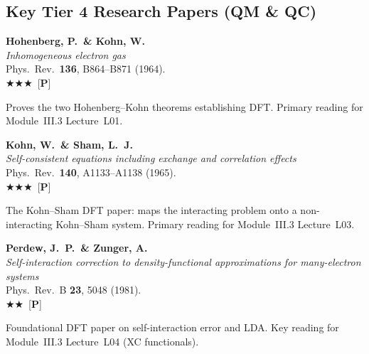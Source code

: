 \documentclass[11pt,a4paper]{article}
\newcommand{\essential}{$\bigstar\bigstar\bigstar$}
\newcommand{\recommended}{$\bigstar\bigstar$}
\newenvironment{bibentry}[1]{\begin{tcolorbox}[entrybox=#1,top=4pt,bottom=4pt]}{\end{tcolorbox}\smallskip}
\begin{document}
\subsection{Key Tier 4 Research Papers (QM \& QC)}

\begin{bibentry}{t4light}
\textbf{Hohenberg, P.\ \& Kohn, W.}\\
\textit{Inhomogeneous electron gas}\\
Phys.~Rev.~\textbf{136}, B864--B871 (1964).\\[3pt]
\essential\ [\textbf{P}]\\[3pt]
\begin{tcolorbox}[annotbox]
Proves the two Hohenberg--Kohn theorems establishing DFT. Primary reading for
Module~III.3 Lecture~L01.
\end{tcolorbox}
\end{bibentry}

\begin{bibentry}{t4light}
\textbf{Kohn, W.\ \& Sham, L.~J.}\\
\textit{Self-consistent equations including exchange and correlation effects}\\
Phys.~Rev.~\textbf{140}, A1133--A1138 (1965).\\[3pt]
\essential\ [\textbf{P}]\\[3pt]
\begin{tcolorbox}[annotbox]
The Kohn--Sham DFT paper: maps the interacting problem onto a non-interacting
Kohn--Sham system. Primary reading for Module~III.3 Lecture~L03.
\end{tcolorbox}
\end{bibentry}

\begin{bibentry}{t4light}
\textbf{Perdew, J.~P.\ \& Zunger, A.}\\
\textit{Self-interaction correction to density-functional approximations for
many-electron systems}\\
Phys.~Rev.~B \textbf{23}, 5048 (1981).\\[3pt]
\recommended\ [\textbf{P}]\\[3pt]
\begin{tcolorbox}[annotbox]
Foundational DFT paper on self-interaction error and LDA. Key reading for
Module~III.3 Lecture~L04 (XC functionals).
\end{tcolorbox}
\end{bibentry}
\end{document}
